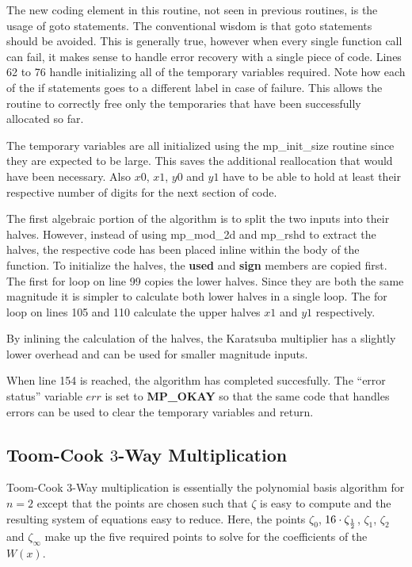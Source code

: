 \documentclass[b5paper]{book}
\begin{document}
The new coding element in this routine, not  seen in previous routines, is the usage of goto statements.  The conventional
wisdom is that goto statements should be avoided.  This is generally true, however when every single function call can fail, it makes sense
to handle error recovery with a single piece of code.  Lines 62 to 76 handle initializing all of the temporary variables 
required.  Note how each of the if statements goes to a different label in case of failure.  This allows the routine to correctly free only
the temporaries that have been successfully allocated so far.

The temporary variables are all initialized using the mp\_init\_size routine since they are expected to be large.  This saves the 
additional reallocation that would have been necessary.  Also $x0$, $x1$, $y0$ and $y1$ have to be able to hold at least their respective
number of digits for the next section of code.

The first algebraic portion of the algorithm is to split the two inputs into their halves.  However, instead of using mp\_mod\_2d and mp\_rshd
to extract the halves, the respective code has been placed inline within the body of the function.  To initialize the halves, the \textbf{used} and 
\textbf{sign} members are copied first.  The first for loop on line 99 copies the lower halves.  Since they are both the same magnitude it 
is simpler to calculate both lower halves in a single loop.  The for loop on lines 105 and 110 calculate the upper halves $x1$ and 
$y1$ respectively.

By inlining the calculation of the halves, the Karatsuba multiplier has a slightly lower overhead and can be used for smaller magnitude inputs.

When line 154 is reached, the algorithm has completed succesfully.  The ``error status'' variable $err$ is set to \textbf{MP\_OKAY} so that
the same code that handles errors can be used to clear the temporary variables and return.  

\subsection{Toom-Cook $3$-Way Multiplication}
Toom-Cook $3$-Way \cite{TOOM} multiplication is essentially the polynomial basis algorithm for $n = 2$ except that the points  are 
chosen such that $\zeta$ is easy to compute and the resulting system of equations easy to reduce.  Here, the points $\zeta_{0}$, 
$16 \cdot \zeta_{1 \over 2}$, $\zeta_1$, $\zeta_2$ and $\zeta_{\infty}$ make up the five required points to solve for the coefficients 
of the $W(x)$.
\end{document}
